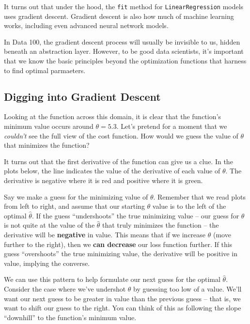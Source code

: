 \documentclass[
  letterpaper,
  DIV=11,
  numbers=noendperiod]{scrreprt}
\begin{document}
It turns out that under the hood, the \texttt{fit} method for
\texttt{LinearRegression} models uses gradient descent. Gradient descent
is also how much of machine learning works, including even advanced
neural network models.

In Data 100, the gradient descent process will usually be invisible to
us, hidden beneath an abstraction layer. However, to be good data
scientists, it's important that we know the basic principles beyond the
optimization functions that harness to find optimal parmaeters.

\hypertarget{digging-into-gradient-descent}{%
\subsection{Digging into Gradient
Descent}\label{digging-into-gradient-descent}}

Looking at the function across this domain, it is clear that the
function's minimum value occurs around \(\theta = 5.3\). Let's pretend
for a moment that we \emph{couldn't} see the full view of the cost
function. How would we guess the value of \(\theta\) that minimizes the
function?

It turns out that the first derivative of the function can give us a
clue. In the plots below, the line indicates the value of the derivative
of each value of \(\theta\). The derivative is negative where it is red
and positive where it is green.

Say we make a guess for the minimizing value of \(\theta\). Remember
that we read plots from left to right, and assume that our starting
\(\theta\) value is to the left of the optimal \(\hat{\theta}\). If the
guess ``undershoots'' the true minimizing value -- our guess for
\(\theta\) is not quite at the value of the \(\hat{\theta}\) that truly
minimizes the function -- the derivative will be \textbf{negative} in
value. This means that if we increase \(\theta\) (move further to the
right), then we \textbf{can decrease} our loss function further. If this
guess ``overshoots'' the true minimizing value, the derivative will be
positive in value, implying the converse.

We can use this pattern to help formulate our next guess for the optimal
\(\hat{\theta}\). Consider the case where we've undershot \(\theta\) by
guessing too low of a value. We'll want our next guess to be greater in
value than the previous guess -- that is, we want to shift our guess to
the right. You can think of this as following the slope ``downhill'' to
the function's minimum value.
\end{document}
